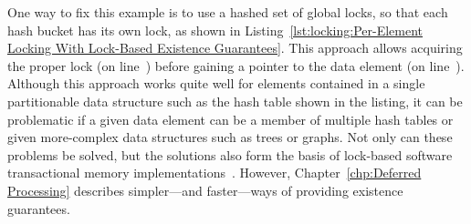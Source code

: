 \begin{fcvref}
One way to fix this example is to use a hashed set of global locks, so
that each hash bucket has its own lock, as shown in
Listing~\ref{lst:locking:Per-Element Locking With Lock-Based Existence Guarantees}.
This approach allows acquiring the proper lock (on line~) before
gaining a pointer to the data element (on line~).
Although this approach works quite well for elements contained in a
single partitionable data structure such as the hash table shown in the
listing, it can be problematic if a given data element can be a member
of multiple hash tables or given more-complex data structures such
as trees or graphs.
Not only can these problems be solved, but the solutions also form
the basis of lock-based software transactional memory
implementations~\cite{Shavit95,DaveDice2006DISC}.
However,
Chapter~\ref{chp:Deferred Processing}
describes simpler---and faster---ways of providing existence guarantees.
\end{fcvref}
